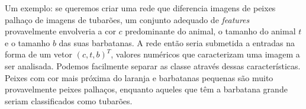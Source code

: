 Um exemplo: se queremos criar uma rede que diferencia imagens de peixes palhaço de imagens de tubarões, um conjunto adequado de \textit{features} provavelmente envolveria a cor $c$ predominante do animal, o tamanho do animal $t$ e o tamanho $b$ das suas barbatanas. A rede então seria submetida a entradas na forma de um vetor $(c, t, b)^T$, valores numéricos que caracterizam uma imagem a ser analisada. Podemos facilmente separar as classe através dessas características. Peixes com cor mais próxima do laranja e barbatanas pequenas são muito provavelmente peixes palhaços, enquanto aqueles que têm a barbatana grande seriam classificados como tubarões.